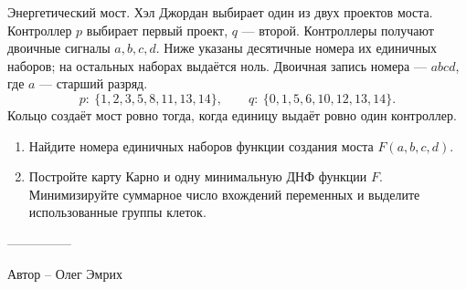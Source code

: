 \question
Энергетический мост. Хэл Джордан выбирает один из двух проектов моста. Контроллер $p$ выбирает первый проект, $q$ --- второй. Контроллеры получают двоичные сигналы $a,b,c,d$. Ниже указаны десятичные номера их единичных наборов; на остальных наборах выдаётся ноль. Двоичная запись номера --- $abcd$, где $a$ --- старший разряд.
\[
p:\ \{1, 2, 3, 5, 8, 11, 13, 14\},\qquad q:\ \{0, 1, 5, 6, 10, 12, 13, 14\}.
\]
Кольцо создаёт мост ровно тогда, когда единицу выдаёт ровно один контроллер.
\begin{enumerate}
\item Найдите номера единичных наборов функции создания моста $F(a,b,c,d)$.
\item Постройте карту Карно и одну минимальную ДНФ функции $F$. Минимизируйте суммарное число вхождений переменных и выделите использованные группы клеток.
\end{enumerate}

---------------

Автор -- Олег Эмрих
